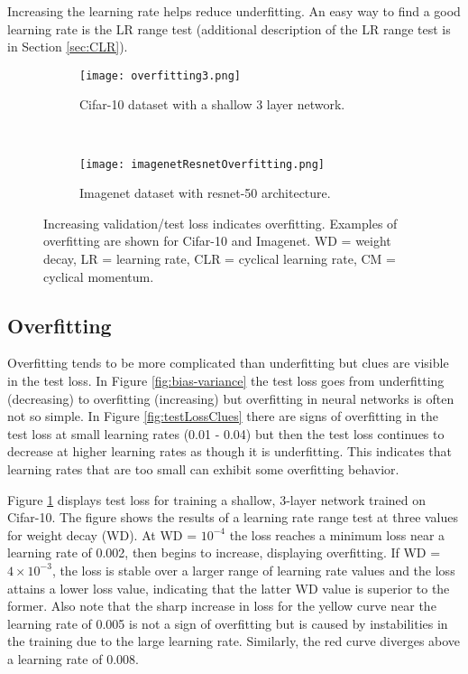 \documentclass{article} %
\begin{document}
Increasing the learning rate helps reduce underfitting.  An easy way to find a good learning rate is the LR range test \citep{smith2017cyclical} (additional description of the LR range test is in Section \ref{sec:CLR}).  

\begin{figure}[tbh]
	\centering
	\begin{subfigure}[b]{0.47\textwidth}
		\texttt{[image: overfitting3.png]}  %
		\caption{Cifar-10 dataset with a shallow 3 layer network.}
		\label{fig:overfitting3}       %
	\end{subfigure}
	\quad
	\hfill
	~ %
	\centering
	\begin{subfigure}[b]{0.47\textwidth}
		\texttt{[image: imagenetResnetOverfitting.png]}
		\caption{Imagenet dataset with resnet-50 architecture.}
		\label{fig:imagenetResnetOverfitting}       %
	\end{subfigure}
	\caption{Increasing validation/test loss indicates overfitting.  Examples of overfitting are shown for Cifar-10 and Imagenet. WD = weight decay, LR = learning rate, CLR = cyclical learning rate, CM = cyclical momentum.}
	\label{fig:OverfittingEx}
	\vspace{-15pt}	
\end{figure}

\subsection{Overfitting}
\label{sec:overfitting}

Overfitting tends to be more complicated than underfitting but clues are visible in the test loss.  In Figure \ref{fig:bias-variance} the test loss goes from underfitting (decreasing) to overfitting (increasing) but overfitting in neural networks is often not so simple.  In Figure \ref{fig:testLossClues} there are signs of overfitting in the test loss at small learning rates (0.01 - 0.04) but then the test loss continues to decrease at higher learning rates as though it is underfitting.  This indicates that learning rates that are too small can exhibit some overfitting behavior.

Figure \ref{fig:overfitting3} displays test loss for training a shallow, 3-layer network trained on Cifar-10.  The figure shows the results of a learning rate range test at three values for weight decay (WD).  At WD = $10^{-4}$ the loss reaches a minimum loss near a learning rate of 0.002, then begins to increase, displaying overfitting.  If WD = $4 \times 10^{-3}$, the loss is stable over a larger range of learning rate values and the loss attains a lower loss value, indicating that the latter WD value is superior to the former.  Also note that the sharp increase in loss for the yellow curve near the learning rate of 0.005 is not a sign of overfitting but is caused by instabilities in the training due to the large learning rate.  Similarly, the red curve diverges above a learning rate of 0.008.
\end{document}
